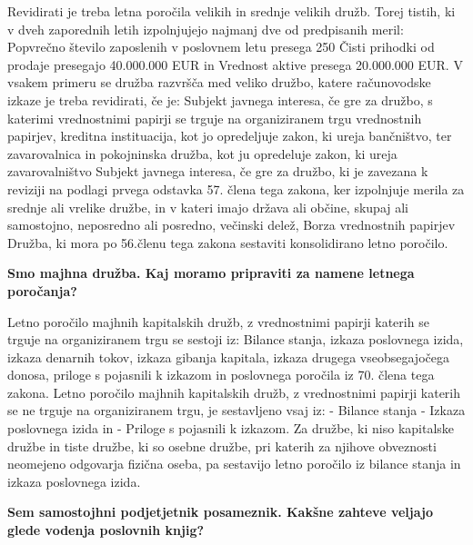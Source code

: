 \documentclass[a4paper,12pt,openright]{book}
\begin{document}
Revidirati je treba letna poročila velikih in srednje velikih družb. Torej tistih, ki v dveh zaporednih letih izpolnjujejo najmanj dve od predpisanih meril:
Popvrečno število zaposlenih v poslovnem letu presega 250
Čisti prihodki od prodaje presegajo 40.000.000 EUR in
Vrednost aktive presega 20.000.000 EUR.
V vsakem primeru se družba razvršča med veliko družbo, katere računovodske izkaze je treba revidirati, če je:
Subjekt javnega interesa, če gre za družbo, s katerimi vrednostnimi papirji se trguje na organiziranem trgu vrednostnih papirjev, kreditna instituacija, kot jo opredeljuje zakon, ki ureja bančništvo, ter zavarovalnica in pokojninska družba, kot ju opredeluje zakon, ki ureja zavarovalništvo
Subjekt javnega interesa, če gre za družbo, ki je zavezana k reviziji na podlagi prvega odstavka 57. člena tega zakona, ker izpolnjuje merila za srednje ali vrelike družbe, in v kateri imajo država ali občine, skupaj ali samostojno, neposredno ali posredno, večinski delež,
Borza vrednostnih papirjev
Družba, ki mora po 56.členu tega zakona sestaviti konsolidirano letno poročilo.

\textbf{Smo majhna družba. Kaj moramo pripraviti za namene letnega poročanja?}

Letno poročilo majhnih kapitalskih družb, z vrednostnimi papirji katerih se trguje na organiziranem trgu se sestoji iz:
Bilance stanja, izkaza poslovnega izida, izkaza denarnih tokov, izkaza gibanja kapitala, izkaza drugega vseobsegajočega donosa, priloge s pojasnili k izkazom in poslovnega poročila iz 70. člena tega zakona.
Letno poročilo majhnih kapitalskih družb, z vrednostnimi papirji katerih se ne trguje na organiziranem trgu, je sestavljeno vsaj iz:
- Bilance stanja
- Izkaza poslovnega izida in
- Priloge s pojasnili k izkazom.
Za družbe, ki niso kapitalske družbe in tiste družbe, ki so osebne družbe, pri katerih za njihove obveznosti neomejeno odgovarja fizična oseba, pa sestavijo letno poročilo iz bilance stanja in izkaza poslovnega izida.

\textbf{Sem samostojhni podjetjetnik posameznik. Kakšne zahteve veljajo glede vodenja poslovnih knjig?}
\end{document}
